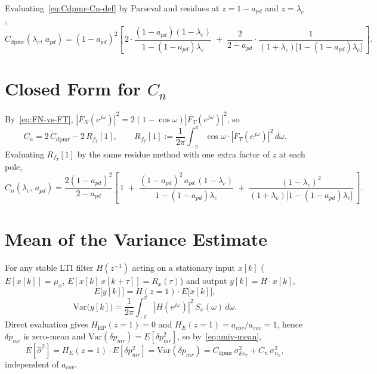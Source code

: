 \documentclass[11pt,a4paper]{ctexart}
\newcommand{\lc}{\lambda_c}
\newcommand{\dxT}{\delta x_{T}}
\newcommand{\nx}{n_{x}}
\newcommand{\dpmr}{\delta p_{mr}}
\newcommand{\HHP}{H_{\mathrm{HP}}}
\newcommand{\HE}{H_{E}}
\newcommand{\FT}{F_{T}}
\newcommand{\FN}{F_{N}}
\newcommand{\Cdpmr}{C_{\mathrm{dpmr}}}
\newcommand{\Cn}{C_{n}}
\newcommand{\apd}{a_{pd}}
\newcommand{\acov}{a_{cov}}
\newcommand{\sighatsq}{\hat{\sigma}^{2}}
\begin{document}
Evaluating~\eqref{eq:Cdpmr-Cn-def} by Parseval and residues at $z = 1-\apd$ and $z = \lc$,
\begin{equation}
\Cdpmr(\lc,\,\apd) = (1-\apd)^{2}\!\left[\,
  2\cdot\frac{(1-\apd)(1-\lc)}{1-(1-\apd)\lc}
  \;+\; \frac{2}{2-\apd}\cdot\frac{1}{(1+\lc)\bigl[1-(1-\apd)\lc\bigr]}
\,\right].
\label{eq:Cdpmr-closed}
\end{equation}

\section{Closed Form for $\Cn$}

By~\eqref{eq:FN-vs-FT}, $|\FN(e^{j\omega})|^{2} = 2(1-\cos\omega)|\FT(e^{j\omega})|^{2}$, so
\begin{equation}
\Cn = 2\,\Cdpmr - 2\,R_{f_T}[1],
\qquad
R_{f_T}[1] := \frac{1}{2\pi}\!\!\int_{-\pi}^{\pi}\!\!\cos\omega\cdot|\FT(e^{j\omega})|^{2}\,d\omega.
\label{eq:Cn-via-RFT}
\end{equation}
Evaluating $R_{f_T}[1]$ by the same residue method with one extra factor of $z$ at each pole,
\begin{equation}
\Cn(\lc,\,\apd) = \frac{2(1-\apd)^{2}}{2-\apd}\!\left[\,
  1
  \;+\; \frac{(1-\apd)^{2}\,\apd\,(1-\lc)}{1-(1-\apd)\lc}
  \;+\; \frac{(1-\lc)^{2}}{(1+\lc)\bigl[1-(1-\apd)\lc\bigr]}
\,\right].
\label{eq:Cn-closed}
\end{equation}

\section{Mean of the Variance Estimate}

For any stable LTI filter $H(z^{-1})$ acting on a stationary input $x[k]$ ($E[x[k]] = \mu_x$, $E[x[k]\,x[k+\tau]] = R_x(\tau)$) and output $y[k] = H\cdot x[k]$,
\begin{equation}
E\bigl[y[k]\bigr] = H(z{=}1)\cdot E\bigl[x[k]\bigr],
\label{eq:univ-mean}
\end{equation}
\begin{equation}
\mathrm{Var}\bigl(y[k]\bigr) = \frac{1}{2\pi}\!\!\int_{-\pi}^{\pi}\!\!|H(e^{j\omega})|^{2}\,S_{x}(\omega)\,d\omega.
\label{eq:univ-var}
\end{equation}
Direct evaluation gives $\HHP(z{=}1) = 0$ and $\HE(z{=}1) = \acov/\acov = 1$, hence $\dpmr$ is zero-mean and $\mathrm{Var}(\dpmr) = E[\dpmr^{2}]$, so by~\eqref{eq:univ-mean},
\begin{equation}
E[\sighatsq] = \HE(z{=}1)\cdot E[\dpmr^{2}] = \mathrm{Var}(\dpmr) = \Cdpmr\,\sigma^{2}_{\dxT} + \Cn\,\sigma^{2}_{\nx},
\label{eq:EWMA-mean}
\end{equation}
independent of $\acov$.
\end{document}
